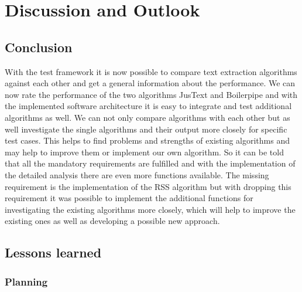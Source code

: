 
\chapter{Discussion and Outlook} %

\label{Discussion and Outlook} %



\section {Conclusion}

With the test framework it is now possible to compare text extraction algorithms against each other and get a general information about the performance. We can now rate the performance of the two algorithms JusText and Boilerpipe and with the implemented software architecture it is easy to integrate and test additional algorithms as well. We can not only compare algorithms with each other but as well investigate the single algorithms and their output more closely for specific test cases. This helps to find problems and strengths of existing algorithms and may help to improve them or implement our own algorithm. So it can be told that all the mandatory requirements are fulfilled and with the implementation of the detailed analysis there are even more functions available. 
The missing requirement is the implementation of the RSS algorithm but with dropping this requirement it was possible to implement the additional functions for investigating the existing algorithms more closely, which will help to improve the existing ones as well as developing a possible new approach.

\section{Lessons learned}

\subsection{Planning}

